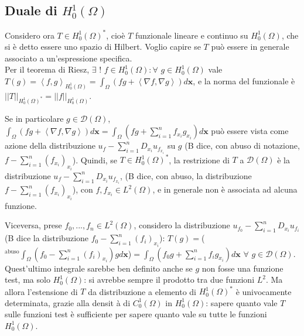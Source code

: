 \documentclass{article}
\begin{document}
\subsection{Duale di $H_{0}^{1}\left( \Omega \right) $}


Considero ora $T\in H_{0}^{1}\left( \Omega \right) ^{\ast }$, cio\`{e} $T$
funzionale lineare e continuo su $H_{0}^{1}\left( \Omega \right) $, che si 
\`{e} detto essere uno spazio di Hilbert. Voglio capire se $T$ può essere in generale associato a un'espressione specifica. \\
Per il teorema di Riesz, $%
\exists $ $!$ $f\in H_{0}^{1}\left( \Omega \right) :\forall $ $g\in
H_{0}^{1}\left( \Omega \right) $ vale $T\left( g\right) =\left\langle
f,g\right\rangle _{H_{0}^{1}\left( \Omega \right) }=\int_{\Omega }\left(
fg+\left\langle \nabla f,\nabla g\right\rangle \right) d\mathbf{x}$, e la
norma del funzionale \`{e} $\left\vert \left\vert T\right\vert \right\vert
_{H_{0}^{1}\left( \Omega \right) ^{\ast }}=\left\vert \left\vert
f\right\vert \right\vert _{H_{0}^{1}\left( \Omega \right) }$.

Se in particolare $g\in \mathcal{D}\left( \Omega \right) $, $\int_{\Omega
}\left( fg+\left\langle \nabla f,\nabla g\right\rangle \right) d\mathbf{x}%
=\int_{\Omega }\left( fg+\sum_{i=1}^{n}f_{x_{i}}g_{x_{i}}\right) d\mathbf{x}$
pu\`{o} essere vista come azione della distribuzione $u_{f}-%
\sum_{i=1}^{n}D_{x_{i}}u_{f_{x_{i}}}$ su $g$ (B dice, con abuso di
notazione, $f-\sum_{i=1}^{n}\left( f_{x_{i}}\right) _{x_{i}}$). Quindi, se $%
T\in H_{0}^{1}\left( \Omega \right) ^{\ast }$, la restrizione di $T$ a $%
\mathcal{D}\left( \Omega \right) $ \`{e} la distribuzione $%
u_{f}-\sum_{i=1}^{n}D_{x_{i}}u_{f_{x_{i}}}$, (B dice, con abuso, la
distribuzione $f-\sum_{i=1}^{n}\left( f_{x_{i}}\right) _{x_{i}}$), con $%
f,f_{x_{i}}\in L^{2}\left( \Omega \right) $, e in generale non \`{e}
associata ad alcuna funzione.

Viceversa, prese $f_{0},...,f_{n}\in L^{2}\left( \Omega \right) $, considero
la distribuzione $u_{f_{0}}-\sum_{i=1}^{n}D_{x_{i}}u_{f_{i}}$ (B dice la
distribuzione $f_{0}-\sum_{i=1}^{n}\left( f_{i}\right) _{x_{i}}$): $T\left(
g\right) =$($^{\text{abuso}}\int_{\Omega }\left( f_{0}-\sum_{i=1}^{n}\left(
f_{i}\right) _{x_{i}}\right) gd\mathbf{x}$)$=\int_{\Omega }\left(
f_{0}g+\sum_{i=1}^{n}f_{i}g_{x_{i}}\right) d\mathbf{x}$ $\forall $ $g\in 
\mathcal{D}\left( \Omega \right) $. Quest'ultimo integrale sarebbe ben
definito anche se $g$ non fosse una funzione test, ma solo $H_{0}^{1}\left(
\Omega \right) $: si avrebbe sempre il prodotto tra due funzioni $L^{2}$. Ma
allora l'estensione di $T$ da distribuzione a elemento di $H_{0}^{1}\left(
\Omega \right) ^{\ast }$ \`{e} univocamente determinata, grazie alla densit%
\`{a} di $C_{0}^{1}\left( \Omega \right) $ in $H_{0}^{1}\left( \Omega
\right) $: sapere quanto vale $T$ sulle funzioni test \`{e} sufficiente per
sapere quanto vale su tutte le funzioni $H_{0}^{1}\left( \Omega \right) $.
\end{document}
